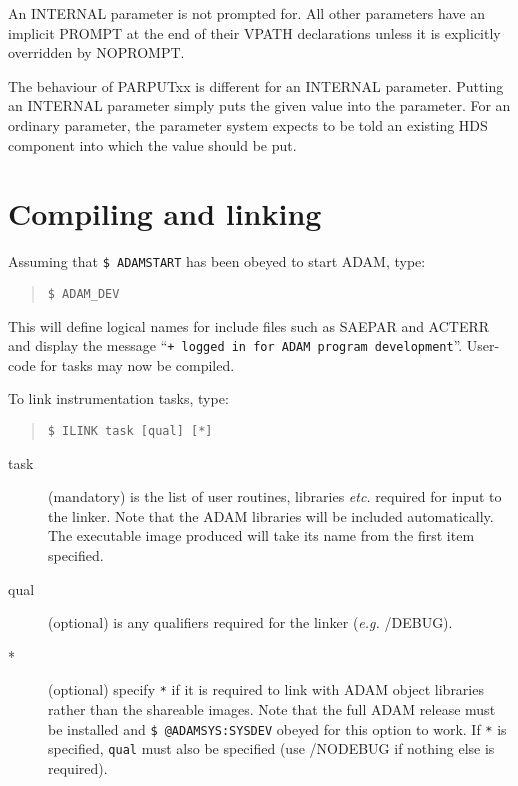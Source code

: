 \documentclass[twoside,11pt]{article}
\newcommand{\xlabel}[1]{}
\renewcommand{\_}{\texttt{\symbol{95}}}
\begin{document}
An INTERNAL parameter is not prompted for. All other parameters have an 
implicit PROMPT at the end of their VPATH declarations unless it is 
explicitly overridden by NOPROMPT.

The behaviour of PAR\_PUTxx is different for an INTERNAL parameter. 
Putting an INTERNAL parameter simply puts the given value into the 
parameter. For an ordinary parameter, the parameter system expects to be 
told an existing HDS component into which the value should be put.

\section{Compiling and linking\xlabel{compiling_and_linking}}

Assuming that \texttt{\$ ADAMSTART} has been obeyed to start ADAM, type:
\small \begin{quote} \begin{verbatim}
$ ADAM_DEV
\end{verbatim} \end{quote} \normalsize
This will define logical names for include files such as SAE\_PAR and ACT\_ERR
and display the message
``\texttt{+ logged in for ADAM program development}''.
User-code for tasks may now be compiled.

To link instrumentation tasks, type:
\small \begin{quote} \begin{verbatim}
$ ILINK task [qual] [*]
\end{verbatim} \end{quote} \normalsize
\begin{description}
\item[task] (mandatory) is the list of user routines, libraries {\em etc.}
required for input to the linker. Note that the ADAM libraries will be
included automatically. The executable image produced will take its name from
the first item specified.
\item[qual] (optional) is any qualifiers required for the linker ({\em e.g.}
/DEBUG).
\item[*] (optional) specify \texttt{*} if it is required to link with ADAM object
libraries rather than the shareable images. Note that the full ADAM release
must be installed and \texttt{\$ @ADAM\_SYS:SYSDEV} obeyed for this option to
work. If \texttt{*} is specified, \texttt{qual} must also be specified (use
/NODEBUG if nothing else is required).
\end{description}
\end{document}
